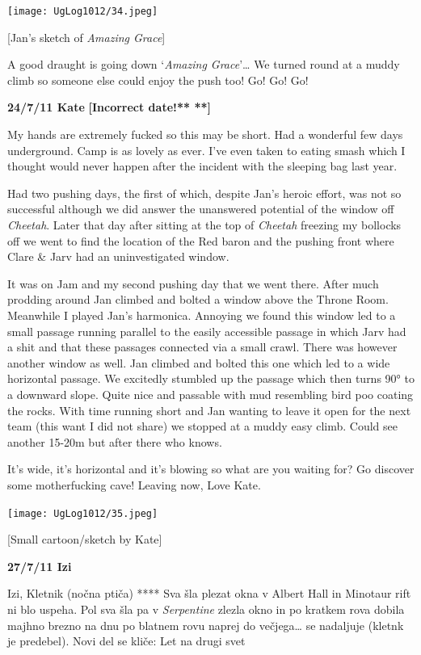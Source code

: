 \texttt{[image: UgLog1012/34.jpeg]}

{[}Jan's sketch of \emph{Amazing Grace}{]}

A good draught is going down `\emph{Amazing Grace}'\ldots{} We turned
round at a muddy climb so someone else could enjoy the push too! Go! Go!
Go!

\textbf{24/7/11 Kate} \textbf{{[}Incorrect date!** **{]}}

My hands are extremely fucked so this may be short. Had a wonderful few
days underground. Camp is as lovely as ever. I've even taken to eating
smash which I thought would never happen after the incident with the
sleeping bag last year.

Had two pushing days, the first of which, despite Jan's heroic effort,
was not so successful although we did answer the unanswered potential of
the window off \emph{Cheetah}. Later that day after sitting at the top
of \emph{Cheetah} freezing my bollocks off we went to find the location
of the Red baron and the pushing front where Clare \& Jarv had an
uninvestigated window.

It was on Jam and my second pushing day that we went there. After much
prodding around Jan climbed and bolted a window above the Throne Room.
Meanwhile I played Jan's harmonica. Annoying we found this window led to
a small passage running parallel to the easily accessible passage in
which Jarv had a shit and that these passages connected via a small
crawl. There was however another window as well. Jan climbed and bolted
this one which led to a wide horizontal passage. We excitedly stumbled
up the passage which then turns 90° to a downward slope. Quite nice and
passable with mud resembling bird poo coating the rocks. With time
running short and Jan wanting to leave it open for the next team (this
want I did not share) we stopped at a muddy easy climb. Could see
another 15-20m but after there who knows.

It's wide, it's horizontal and it's blowing so what are you waiting for?
Go discover some motherfucking cave! Leaving now, Love Kate.

\texttt{[image: UgLog1012/35.jpeg]}

{[}Small cartoon/sketch by Kate{]}

\textbf{27/7/11 Izi}

Izi, Kletnik (nočna ptiča) **** Sva šla plezat okna v Albert Hall in
Minotaur rift ni blo uspeha. Pol sva šla pa v \emph{Serpentine} zlezla
okno in po kratkem rova dobila majhno brezno na dnu po blatnem rovu
naprej do večjega\ldots{} se nadaljuje (kletnk je predebel). Novi del se
kliče: Let na drugi svet

